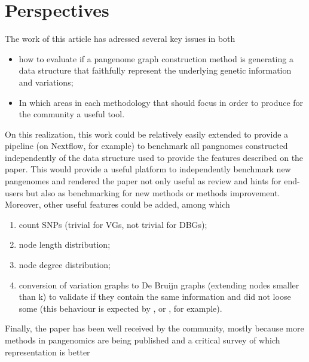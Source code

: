 \section{Perspectives}
The work of this article has adressed several key issues in both 
\begin{itemize}
    \item how to evaluate if a pangenome graph construction method is generating a data structure that faithfully represent the underlying genetic information and variations;
    \item In which areas in each methodology that should focus in order to produce for the community a useful tool.
\end{itemize}    
On this realization, this work could be relatively easily extended to provide a pipeline (on Nextflow, for example) to benchmark all pangnomes constructed independently of the data structure used to provide the features described on the paper. This would provide a useful platform to independently benchmark new pangenomes and rendered the paper not only useful as review and hints for end-users but also as benchmarking for new methods or methods improvement.
Moreover, other useful features could be added, among which
\begin{enumerate}
    \item count SNPs (trivial for VGs, not trivial for DBGs);
    \item node length distribution;
    \item node degree distribution;
    \item conversion of variation graphs to De Bruijn graphs (extending nodes smaller than k) to validate if they contain the same information and did not loose some (this behaviour is expected by \minigraph, or \mcactus, for example).
\end{enumerate}
Finally, the paper has been well received by the community, mostly because more methods in pangenomics are being published and a critical survey of which representation is better   
